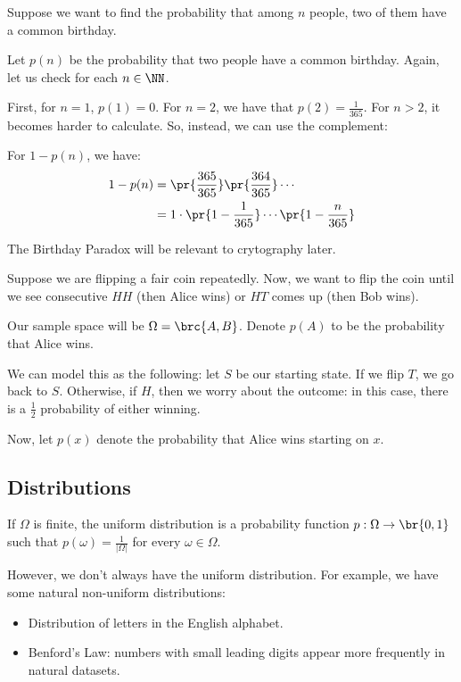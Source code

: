 \documentclass[openany]{book}
\begin{document}
\begin{example}
	Suppose we want to find the probability that among $n$ people, two of them have a common birthday.
	
	Let $p(n)$ be the probability that two people have a common birthday. Again, let us check for each $n \in \NN$.
	
	First, for $n = 1$, $p(1) = 0$. For $n=2$, we have that $p(2) = \frac{1}{365}$. For $n > 2$, it becomes harder to calculate. So, instead, we can use the complement:
	
	For $1 - p(n)$, we have:
	\begin{align*}
		1 - p(n) &= \pr{\frac{365}{365}}\pr{\frac{364}{365}}\cdots \\
		&= 1 \cdot \pr{1 - \frac{1}{365}} \cdots \pr{1 - \frac n {365}}
	\end{align*}
\end{example}

The Birthday Paradox will be relevant to crytography later.

\begin{example}
	Suppose we are flipping a fair coin repeatedly. Now, we want to flip the coin until we see consecutive $HH$ (then Alice wins) or $HT$ comes up (then Bob wins).
	
	Our sample space will be $\Omega = \brc{A, B}$. Denote $p(A)$ to be the probability that Alice wins.
	
	We can model this as the following: let $S$ be our starting state. If we flip $T$, we go back to $S$. Otherwise, if $H$, then we worry about the outcome: in this case, there is a $\frac{1}{2}$ probability of either winning.
	
	
	Now, let $p(x)$ denote the probability that Alice wins starting on $x$.
\end{example}

\subsection{Distributions}
If $\Omega$ is finite, the uniform distribution is a probability function $p : \Omega \rightarrow \br{0,1}$ such that $p(\omega) = \frac{1}{\lvert \Omega \rvert}$ for every $\omega \in \Omega$.

However, we don't always have the uniform distribution. For example, we have some natural non-uniform distributions:
\begin{itemize}
	\item Distribution of letters in the English alphabet.
	\item Benford's Law: numbers with small leading digits appear more frequently in natural datasets.
\end{itemize}
\end{document}
